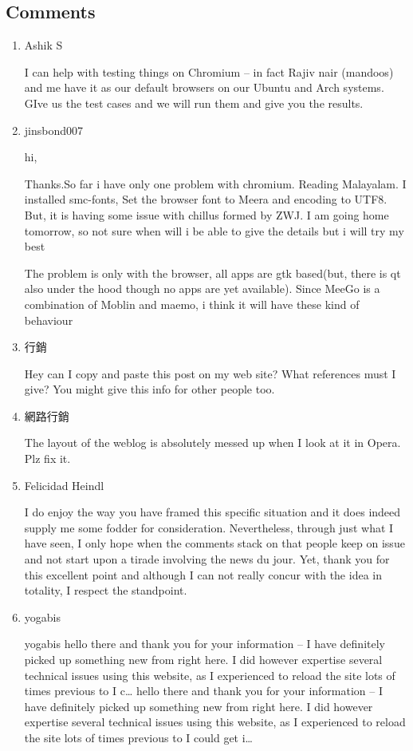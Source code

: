 \subsection*{Comments}
\begin{enumerate}
 \item{Ashik S}
 
I can help with testing things on Chromium – in fact Rajiv nair (mandoos) and me have it as our default browsers on our Ubuntu and Arch systems. GIve us the test cases and we will run them and give you the results.

 \item{jinsbond007}
 
hi,

Thanks.So far i have only one problem with chromium. Reading Malayalam.
I installed smc-fonts, Set the browser font to Meera and encoding to UTF8. But, it is having some issue with chillus formed by ZWJ.
I am going home tomorrow, so not sure when will i be able to give the details but i will try my best 

The problem is only with the browser, all apps are gtk based(but, there is qt also under the hood though no apps are yet available). Since MeeGo is a combination of Moblin and maemo, i think it will have these kind of behaviour 

 \item{行銷}
 
Hey can I copy and paste this post on my web site? What references must I give? You might give this info for other people too.

 \item{網路行銷}
 
The layout of the weblog is absolutely messed up when I look at it in Opera. Plz fix it.

 \item{Felicidad Heindl}
 
I do enjoy the way you have framed this specific situation and it does indeed supply me some fodder for consideration. Nevertheless, through just what I have seen, I only hope when the comments stack on that people keep on issue and not start upon a tirade involving the news du jour. Yet, thank you for this excellent point and although I can not really concur with the idea in totality, I respect the standpoint.

 \item{yogabis}
 
yogabis hello there and thank you for your information – I have definitely picked up something new from right here. I did however expertise several technical issues using this website, as I experienced to reload the site lots of times previous to I c…
hello there and thank you for your information – I have definitely picked up something new from right here. I did however expertise several technical issues using this website, as I experienced to reload the site lots of times previous to I could get i…

\end{enumerate}

\newpage 
